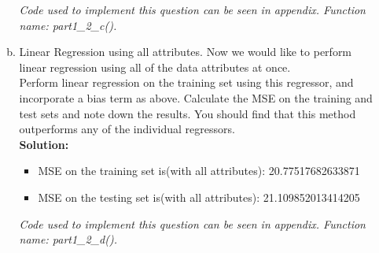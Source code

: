 \documentclass[A4,12pt]{article}
\begin{document}
\begin{enumerate}[4.]
\begin{enumerate}[a.]
\begin{itemize}
      \end{itemize}
      \textit{Code used to implement this question can be seen in appendix. Function name: part1\_2\_c().}
    \item Linear Regression using all attributes. Now we would like to perform linear regression using all of the data attributes at once.\\
    Perform linear regression on the training set using this regressor, and incorporate a bias term as above. Calculate the MSE on the training and test sets and note down the results. You should find that this method outperforms any of the individual regressors.\\
    \textbf{Solution:}
    \begin{itemize}
      \item MSE on the training set is(with all attributes): 20.77517682633871
      \item MSE on the testing set is(with all attributes): 21.109852013414205
    \end{itemize}
     \textit{Code used to implement this question can be seen in appendix. Function name: part1\_2\_d().}
  \end{enumerate}
\end{enumerate}
\end{document}
